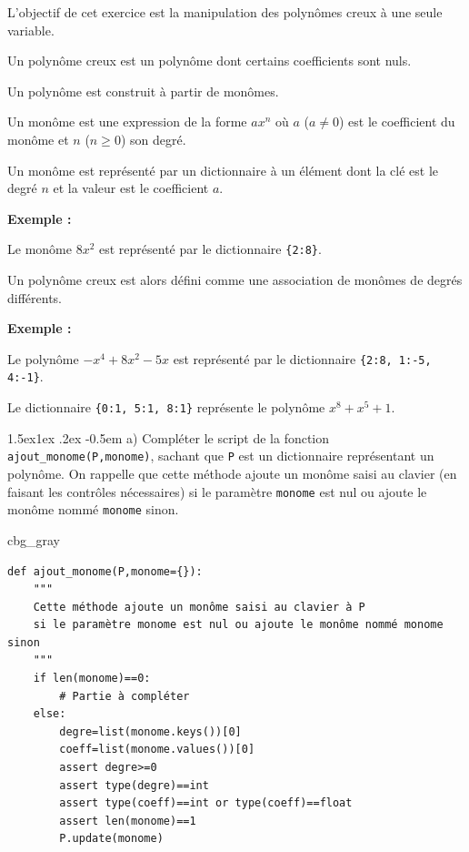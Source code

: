 \documentclass[%
oneside,                 %
final,                   %
10pt,french]{article}
\makeatletter
\newenvironment{_cod_tight}[1]{
   \def\FrameCommand{\colorbox{#1}}
   \FrameRule0.6pt\MakeFramed {\FrameRestore}\vskip3mm}
   {\vskip0mm\endMakeFramed}
\newenvironment{cod}[1]{
\bgroup\rmfamily
\fboxsep=0mm\relax
\begin{_cod_tight}{#1}
\list{}{\parsep=-2mm\parskip=0mm\topsep=0pt\leftmargin=2mm
\rightmargin=2\leftmargin\leftmargin=4pt\relax}
\item\relax}
{\endlist\end{_cod_tight}\egroup}
\newenvironment{doconceexercise}{}{}
\newcounter{doconceexercisecounter}
\newcommand\subex{\@startsection{paragraph}{4}{\z@}%
                  {1.5ex\@plus1ex \@minus.2ex}%
                  {-0.5em}%
                  {\normalfont\normalsize\bfseries}}
\makeatother
\begin{document}


\begin{doconceexercise}



L'objectif de cet exercice est la manipulation des polynômes creux à une seule variable.

Un polynôme creux est un polynôme dont certains coefficients sont nuls.

Un polynôme est construit à partir de monômes.

Un monôme est une expression de la forme $a x^n$ où $a$ ($a \neq 0$) est le coefficient du monôme et $n$ ($n \ge 0$) son degré.

Un monôme est représenté par un dictionnaire à un élément dont la clé est le degré $n$ et la valeur est le coefficient $a$.

\textbf{Exemple :}

Le monôme $8 x^2$ est représenté par le dictionnaire \Verb!{2:8}!.

Un polynôme creux est alors défini comme une association de monômes de degrés différents.

\textbf{Exemple :}

Le polynôme $-x^4 + 8 x^2 - 5 x$ est représenté par le dictionnaire \Verb!{2:8, 1:-5, 4:-1}!.

Le dictionnaire \Verb!{0:1, 5:1, 8:1}! représente le polynôme $x^8 + x^5 + 1$.


\subex{a)}
Compléter le script de la fonction \Verb!ajout_monome(P,monome)!, sachant que \texttt{P} est un dictionnaire représentant un polynôme. On rappelle que cette méthode ajoute un monôme saisi au clavier (en faisant les contrôles nécessaires) si le paramètre \texttt{monome} est nul ou ajoute le monôme nommé \texttt{monome} sinon.

\begin{cod}{cbg_gray}\begin{verbatim}
def ajout_monome(P,monome={}):
    """
    Cette méthode ajoute un monôme saisi au clavier à P
    si le paramètre monome est nul ou ajoute le monôme nommé monome sinon
    """
    if len(monome)==0:
        # Partie à compléter
    else:
        degre=list(monome.keys())[0]
        coeff=list(monome.values())[0]
        assert degre>=0
        assert type(degre)==int
        assert type(coeff)==int or type(coeff)==float
        assert len(monome)==1
        P.update(monome)
\end{verbatim}
\end{cod}
\noindent


\end{doconceexercise}
\end{document}
